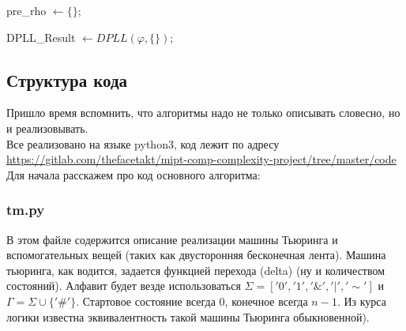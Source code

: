 \documentclass[paper=a4, fontsize=11pt]{scrartcl}
\begin{document}
\pagebreak

\begin{algorithm}[H]
	 {


		pre\_rho $\leftarrow \{\}$;

        DPLL\_Result  $ \leftarrow DPLL(\varphi, \{\})$;

	}
\end{algorithm}



\subsection{Структура кода}

Пришло время вспомнить, что алгоритмы надо не только описывать словесно, но
и реализовывать.\\

Все реализовано на языке python3,
код лежит по адресу \url{https://gitlab.com/thefacetakt/mipt-comp-complexity-project/tree/master/code} \\

Для начала расскажем про код основного алгоритма:\\

\subsubsection{tm.py}

В этом файле содержится описание реализации машины Тьюринга и вспомогательных
вещей (таких как двусторонняя бесконечная лента). Машина тьюринга, как водится,
задается функцией перехода (delta) (ну и количеством состояний).
Алфавит будет везде использоваться $\Sigma = ['0', '1', '\&', '|', '\sim']$ и
$\Gamma = \Sigma \cup \{'\#'\}$. Стартовое состояние всегда 0, конечное всегда
$n - 1$. Из курса логики известна эквивалентность такой машины Тьюринга
обыкновенной). \\
\end{document}
